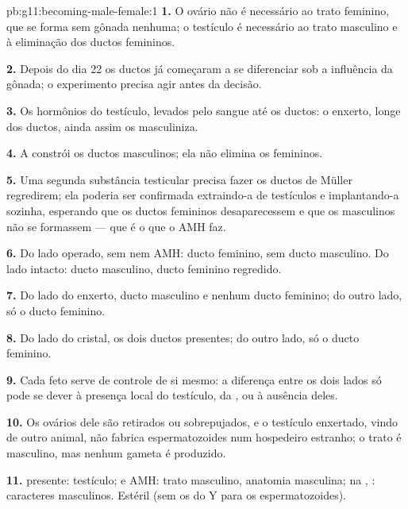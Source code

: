 \begin{solution}{pb:g11:becoming-male-female:1}
\textbf{1.} O ovário não é necessário ao trato feminino, que se forma
sem gônada nenhuma; o testículo é necessário ao trato masculino e à
eliminação dos ductos femininos.

\textbf{2.} Depois do dia 22 os ductos já começaram a se diferenciar
sob a influência da gônada; o experimento precisa agir antes da decisão.

\textbf{3.} Os hormônios do testículo, levados pelo sangue até os
ductos: o enxerto, longe dos ductos, ainda assim os masculiniza.

\textbf{4.} A  constrói os ductos masculinos; ela não
elimina os femininos.

\textbf{5.} Uma segunda substância testicular precisa fazer os ductos
de Müller regredirem; ela poderia ser confirmada extraindo-a de
testículos e implantando-a sozinha, esperando que os ductos femininos
desaparecessem e que os masculinos não se formassem --- que é o que o
AMH faz.

\textbf{6.} Do lado operado, sem  nem AMH: ducto feminino,
sem ducto masculino. Do lado intacto: ducto masculino, ducto feminino
regredido.

\textbf{7.} Do lado do enxerto, ducto masculino e nenhum ducto
feminino; do outro lado, só o ducto feminino.

\textbf{8.} Do lado do cristal, os dois ductos presentes; do outro
lado, só o ducto feminino.

\textbf{9.} Cada feto serve de controle de si mesmo: a diferença entre
os dois lados só pode se dever à presença local do testículo, da
, ou à ausência deles.

\textbf{10.} Os ovários dele são retirados ou sobrepujados, e o
testículo enxertado, vindo de outro animal, não fabrica espermatozoides
num hospedeiro estranho; o trato é masculino, mas nenhum gameta é
produzido.

\textbf{11.}  presente: testículo;  e AMH: trato
masculino, anatomia masculina; na , : caracteres
masculinos. Estéril (sem os  do Y para os espermatozoides).


\end{solution}
